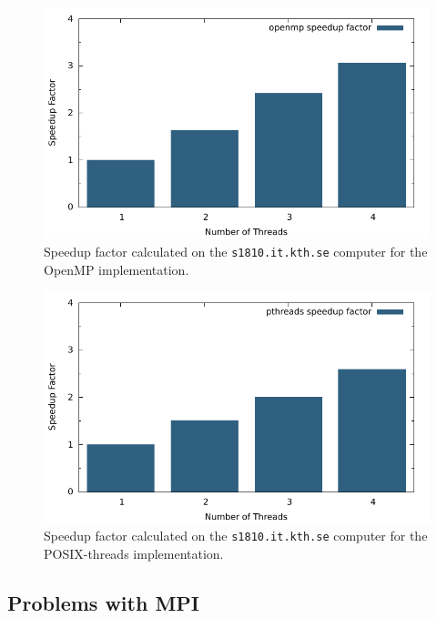 \begin{figure}[H]
	\includegraphics{plots/openmp_speedup.pdf}
	\caption{Speedup factor calculated on the \texttt{s1810.it.kth.se} computer for the OpenMP implementation.}
\end{figure}
\begin{figure}[H]
	\includegraphics{plots/pthreads_speedup.pdf}
	\caption{Speedup factor calculated on the \texttt{s1810.it.kth.se} computer for the POSIX-threads implementation.}
\end{figure}

\subsection{Problems with MPI}

